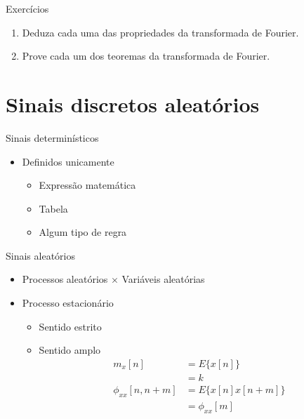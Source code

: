 \documentclass[
size=17pt,
paper=smartboard,
mode=present,
display=slidesnotes,
style=sailor,
nopagebreaks,
blackslide,
fleqn]{powerdot}
\begin{document}
\begin{note}{Exercícios}
\begin{enumerate}
   \item Deduza cada uma das propriedades da transformada de Fourier.
   \item Prove cada um dos teoremas da transformada de Fourier. 
\end{enumerate}

\end{note}


\section[slide=false]{Sinais discretos aleatórios}
\begin{slide}[toc=]{Sinais determinísticos}
\begin{itemize}
   \item Definidos unicamente
   \begin{itemize}
      \item Expressão matemática
      \item Tabela
      \item Algum tipo de regra
   \end{itemize}
   
\end{itemize}
\end{slide}

\begin{slide}[toc=]{Sinais aleatórios}
\begin{itemize}
   \item Processos aleat\'orios $\times$ Vari\'aveis aleat\'orias
   \item Processo estacion\'ario
   \begin{itemize}
      \item Sentido estrito
      \item Sentido amplo
      \begin{align*}
         m_x[n] &= E\{x[n]\}\\
                &= k\\
         \phi_{xx}[n,n+m] &= E\{x[n]x[n+m]\}\\
                          &= \phi_{xx}[m]
      \end{align*}
   \end{itemize}
\end{itemize}
\end{slide}
\end{document}
